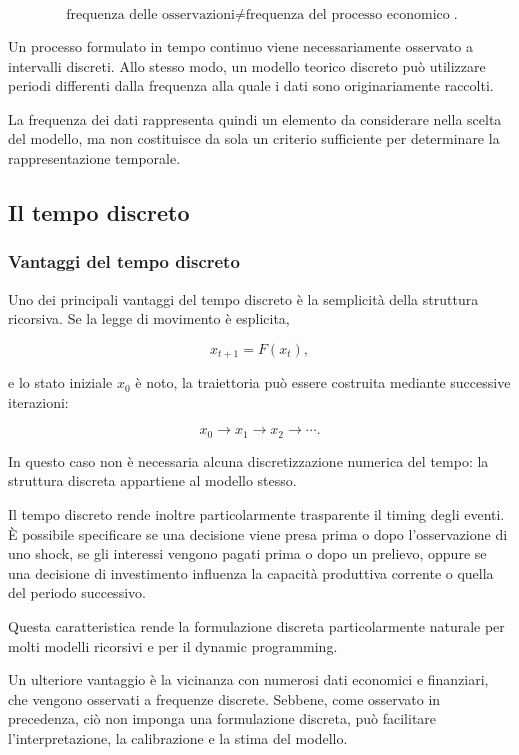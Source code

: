 \documentclass{book}
\begin{document}
$$
\boxed{
\text{frequenza delle osservazioni}
\neq
\text{frequenza del processo economico}
}.
$$

Un processo formulato in tempo continuo viene necessariamente osservato a intervalli discreti. Allo stesso modo, un modello teorico discreto può utilizzare periodi differenti dalla frequenza alla quale i dati sono originariamente raccolti.

La frequenza dei dati rappresenta quindi un elemento da considerare nella scelta del modello, ma non costituisce da sola un criterio sufficiente per determinare la rappresentazione temporale.

\subsection{Il tempo discreto}
\subsubsection{Vantaggi del tempo discreto}

Uno dei principali vantaggi del tempo discreto è la semplicità della struttura ricorsiva. Se la legge di movimento è esplicita,

$$
x_{t+1}=F(x_t),
$$

e lo stato iniziale $x_0$ è noto, la traiettoria può essere costruita mediante successive iterazioni:

$$
x_0
\longrightarrow
x_1
\longrightarrow
x_2
\longrightarrow
\cdots.
$$

In questo caso non è necessaria alcuna discretizzazione numerica del tempo: la struttura discreta appartiene al modello stesso.

Il tempo discreto rende inoltre particolarmente trasparente il timing degli eventi. È possibile specificare se una decisione viene presa prima o dopo l'osservazione di uno shock, se gli interessi vengono pagati prima o dopo un prelievo, oppure se una decisione di investimento influenza la capacità produttiva corrente o quella del periodo successivo.

Questa caratteristica rende la formulazione discreta particolarmente naturale per molti modelli ricorsivi e per il dynamic programming.

Un ulteriore vantaggio è la vicinanza con numerosi dati economici e finanziari, che vengono osservati a frequenze discrete. Sebbene, come osservato in precedenza, ciò non imponga una formulazione discreta, può facilitare l'interpretazione, la calibrazione e la stima del modello.
\end{document}
